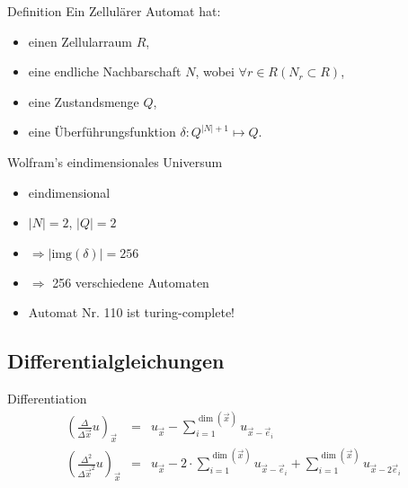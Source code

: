 \documentclass{beamer}
\begin{document}
\begin{frame}{Definition}
Ein Zellulärer Automat hat:
  \begin{itemize}
\item einen Zellularraum $R$,
\item eine endliche Nachbarschaft $N$, wobei $\forall r \in R \left(N_r \subset R\right)$,
\item eine Zustandsmenge $Q$,
\item eine Überführungsfunktion $\delta: Q^{|N| + 1}\mapsto Q$.
	
  \end{itemize}
\end{frame}

\begin{frame}{Wolfram's eindimensionales Universum}
  \begin{itemize}
\item eindimensional
\item $|N| = 2$, $|Q| = 2$
\item $\Rightarrow |\mathrm{img}(\delta)| = 256$
\item $\Rightarrow$ 256 verschiedene Automaten
\item Automat Nr. 110 ist turing-complete!
	
  \end{itemize}
\end{frame}

\subsection{Differentialgleichungen}

\begin{frame}{Differentiation}
\begin{eqnarray*}
	\left(\frac {\Delta}{\Delta \vec x} u\right)_{\vec x} &=& u_{\vec x} - \sum\limits_{i=1}^{\dim(\vec x)} u_{\vec x - \vec e_i} \\
\left( \frac{\Delta^2}{\Delta \vec x^2} u\right)_{\vec x} &=& u_{\vec x} - 2\cdot\sum\limits_{i=1}^{\dim(\vec x)} u_{\vec x - \vec e_i} + \sum\limits_{i=1}^{\dim(\vec x)} u_{\vec x - 2\vec e_i}
\end{eqnarray*}
\end{frame}
\end{document}
